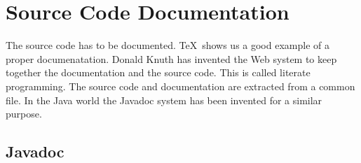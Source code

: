 \chapter{Source Code Documentation}


The source code has to be documented. \TeX\ shows us a good example of
a proper documenatation. Donald Knuth has invented the Web system to
keep together the documentation and the source code. This is called
literate programming. The source code and
documentation are extracted from a common file. In the Java world the
Javadoc system has been invented for a similar purpose.

\section{Javadoc}

